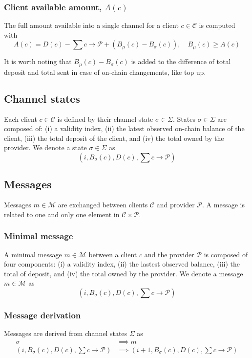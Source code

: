 \documentclass{llncs}
\begin{document}
\subsubsection{Client available amount, $A(c)$} The full amount available into a single channel for a client $c \in \mathcal{C}$ is computed with
$$A(c) = D(c) - \textstyle \sum c \rightarrow \mathcal{P} + (B_\mu(c) - B_\sigma(c)), \quad B_\mu(c) \geq A(c)$$

It is worth noting that $B_\mu(c) - B_\sigma(c)$ is added to the difference of total deposit and total sent in case of on-chain changements, like top up.

\subsection{Channel states} Each client $c \in \mathcal{C}$ is defined by their channel state $\sigma \in \Sigma$. States $\sigma \in \Sigma$ are composed of: (i) a validity index, (ii) the latest observed on-chain balance
of the client, (iii) the total deposit of the client, and (iv) the total owned by the provider. We denote a state $\sigma \in \Sigma$ as
$$(i, B_\sigma(c), D(c), \textstyle \sum c \rightarrow \mathcal{P})$$

\subsection{Messages} Messages $m \in \mathcal{M}$ are exchanged between clients $\mathcal{C}$ and provider $\mathcal{P}$. A message is related to one and only one element in $\mathcal{C} \times \mathcal{P}$.

\subsubsection{Minimal message} A minimal message $m \in \mathcal{M}$ between a client $c$ and the provider $\mathcal{P}$ is composed of four components: (i) a validity index, (ii) the lastest observed balance, (iii) the total of deposit, and (iv) the total owned by the provider. We denote a message $m \in \mathcal{M}$ as
$$(i, B_\sigma(c), D(c), \textstyle \sum c \rightarrow \mathcal{P})$$

\subsubsection{Message derivation} Messages are derived from channel states $\Sigma$ as
\begin{equation*}
\begin{split}
    \sigma &\implies m \\
    (i, B_\sigma(c), D(c), \textstyle \sum c \rightarrow \mathcal{P}) &\implies (i+1, B_\sigma(c), D(c), \textstyle \sum c \rightarrow \mathcal{P}) \\
\end{split}
\end{equation*}
\end{document}

